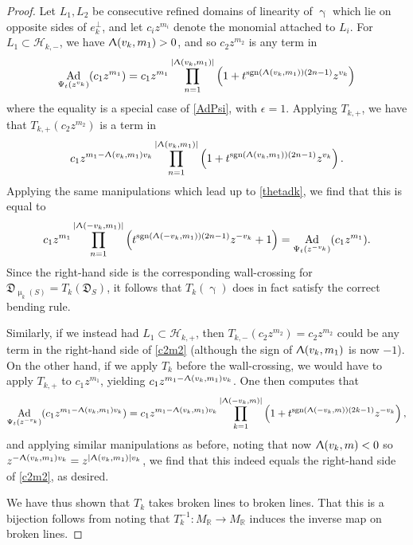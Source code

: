\documentclass{amsart}
\DeclareMathOperator{\sign}{sgn}
\DeclareMathOperator{\Ad}{Ad}
\let\bb=\mathbb
\let\rar=\rightarrow
\let\f=\mathfrak
\let\s=\mathcal
\renewcommand{\gamma}{\upgamma}
\renewcommand{\Lambda}{\Uplambda}
\renewcommand{\mu}{\upmu}
\theoremstyle{plain}%
\theoremstyle{definition}
\theoremstyle{remark}
\begin{document}
\begin{proof}
Let $L_1,L_2$ be consecutive refined domains of linearity of $\gamma$ which lie on opposite sides of $e_k^{\perp}$, and let $c_iz^{m_i}$ denote the monomial attached to $L_i$.  For $L_1\subset \s{H}_{k,-}$, we have $\Lambda(v_k,m_1)>0$, and so $c_2z^{m_2}$ is any term in
\begin{align}\label{c2m2}
    \Ad_{\Psi_t(z^{v_k})} (c_1z^{m_1}) = c_1z^{m_1} \prod_{n=1}^{|\Lambda(v_k,m_1)|}  \left(1+t^{\sign(\Lambda(v_k,m_1))(2n-1)}z^{v_k}\right)
\end{align}
where the equality is a special case of \eqref{AdPsi}, with $\epsilon=1$.  Applying $T_{k,+}$, we have that $T_{k,+}(c_2z^{m_2})$ is a term in
\begin{align*}
    c_1z^{m_1-\Lambda(v_k,m_1)v_k} \prod_{n=1}^{|\Lambda(v_k,m_1)|}  \left(1+t^{\sign(\Lambda(v_k,m_1))(2n-1)}z^{v_k}\right).
\end{align*}
Applying the same manipulations which lead up to \eqref{thetadk}, we find that this is equal to
\begin{align*}
    c_1z^{m_1} \prod_{n=1}^{|\Lambda(-v_k,m_1)|}  \left(t^{\sign(\Lambda(-v_k,m_1))(2n-1)}z^{-v_k}+1\right)=\Ad_{\Psi_t(z^{-v_k})}(c_1z^{m_1}).
\end{align*}
Since the right-hand side is the corresponding wall-crossing for $\f{D}_{\mu_k(S)}=T_k(\f{D}_S)$, it follows that $T_k(\gamma)$ does in fact satisfy the correct bending rule.

Similarly, if we instead had $L_1\subset \s{H}_{k,+}$, then $T_{k,-}(c_2z^{m_2})=c_2z^{m_2}$ could be any term in the right-hand side of \eqref{c2m2} (although the sign of $\Lambda(v_k,m_1)$ is now $-1$).  On the other hand, if we apply $T_k$ before the wall-crossing, we would have to apply $T_{k,+}$ to $c_1z^{m_1}$, yielding $c_1z^{m_1-\Lambda(v_k,m_1)v_k}$.  One then computes that
\begin{align*}
\Ad_{\Psi_t(z^{-v_k})}(c_1z^{m_1-\Lambda(v_k,m_1)v_k}) =c_1z^{m_1-\Lambda(v_k,m_1)v_k} \prod_{k=1}^{|\Lambda(-v_k,m)|}  \left(1+t^{\sign(\Lambda(-v_k,m))(2k-1)}z^{-v_k}\right),
    \end{align*}
and applying similar manipulations as before, noting that now $\Lambda(v_k,m)<0$ so  $z^{-\Lambda(v_k,m_1)v_k}=z^{|\Lambda(v_k,m_1)|v_k}$, we find that this indeed equals the right-hand side of \eqref{c2m2}, as desired.

We have thus shown that $T_k$ takes broken lines to broken lines.  That this is a bijection follows from noting that $T_k^{-1}\colon M_{\bb{R}}\rar M_{\bb{R}}$ induces the inverse map on broken lines.
\end{proof}
\end{document}
